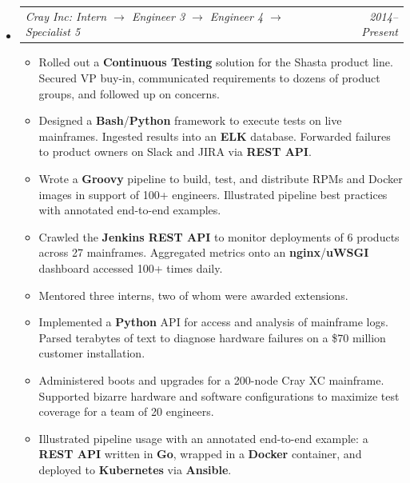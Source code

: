 \documentclass[12pt,letterpaper]{article}
\makeatletter
\newcommand{\headerpair}[2]{
    \begin{tabular*}{\linewidth}{l@{ \extracolsep{\fill} }r} {\large\emph{#1}} & {\large\emph{#2}}
    \end{tabular*}
}
\newcommand{\headerrow}[3]{\headerpair{#2: #1}{#3}}
\makeatother
\begin{document}
\begin{itemize}[leftmargin=\parindent]
    \item[]
        \headerrow
            {Intern $\to$ Engineer 3 $\to$ Engineer 4 $\to$ Specialist 5}
            {Cray Inc}
            {2014--Present}
        \begin{itemize}[leftmargin=\parindent]

            \item Rolled out a \textbf{Continuous Testing} solution for the Shasta product line. Secured VP buy-in, communicated requirements to dozens of product groups, and followed up on concerns.

            \item Designed a \textbf{Bash}/\textbf{Python} framework to execute tests on live mainframes. Ingested results into an \textbf{ELK} database. Forwarded failures to product owners on Slack and JIRA via \textbf{REST API}.

            \item Wrote a \textbf{Groovy} pipeline to build, test, and distribute RPMs and Docker images in support of 100+ engineers. Illustrated pipeline best practices with annotated end-to-end examples.

            \item Crawled the \textbf{Jenkins REST API} to monitor deployments of 6 products across 27 mainframes. Aggregated metrics onto an \textbf{nginx}/\textbf{uWSGI} dashboard accessed 100+ times daily.

            \item Mentored three interns, two of whom were awarded extensions.

            \item Implemented a \textbf{Python} API for access and analysis of mainframe logs. Parsed terabytes of text to diagnose hardware failures on a \$70 million customer installation.

            \item Administered boots and upgrades for a 200-node Cray XC mainframe. Supported bizarre hardware and software configurations to maximize test coverage for a team of 20 engineers.

            \item Illustrated pipeline usage with an annotated end-to-end example: a \textbf{REST API} written in \textbf{Go}, wrapped in a \textbf{Docker} container, and deployed to \textbf{Kubernetes} via \textbf{Ansible}.


\end{itemize}
\end{itemize}
\end{document}
